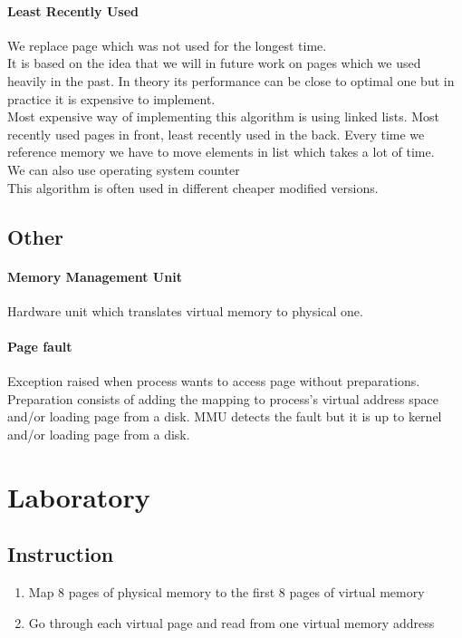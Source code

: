 \documentclass{article}
\begin{document}
\paragraph{Least Recently Used}
We replace page which was not used for the longest time. \\
It is based on the idea that we will in future work on pages which we used
heavily in the past. In theory its performance can be close to optimal one but
in practice it is expensive to implement. \\
Most expensive way of implementing this algorithm is using linked lists. Most
recently used pages in front, least recently used in the back. Every time we
reference memory we have to move elements in list which takes a lot of time. \\
We can also use operating system counter \\
This algorithm is often used in different cheaper modified versions.
\cite{Page Replacement Algorithms}
\cite{pageWiki}
\subsection{Other}
\paragraph{Memory Management Unit} 
Hardware unit which translates virtual memory to physical one.
\cite{mmuWiki}
\paragraph{Page fault}
Exception raised when process wants to access page without preparations.
Preparation consists of adding the mapping to process's virtual address space
and/or loading page from a disk. MMU detects the fault but it is up to kernel
and/or loading page from a disk. 

\section{Laboratory}
\subsection{Instruction}
\begin{enumerate}
	\item Map 8 pages of physical memory to the first 8 pages of virtual
		memory
	\item Go through each virtual page and read from one virtual memory
		address 
\end{enumerate}
\end{document}

